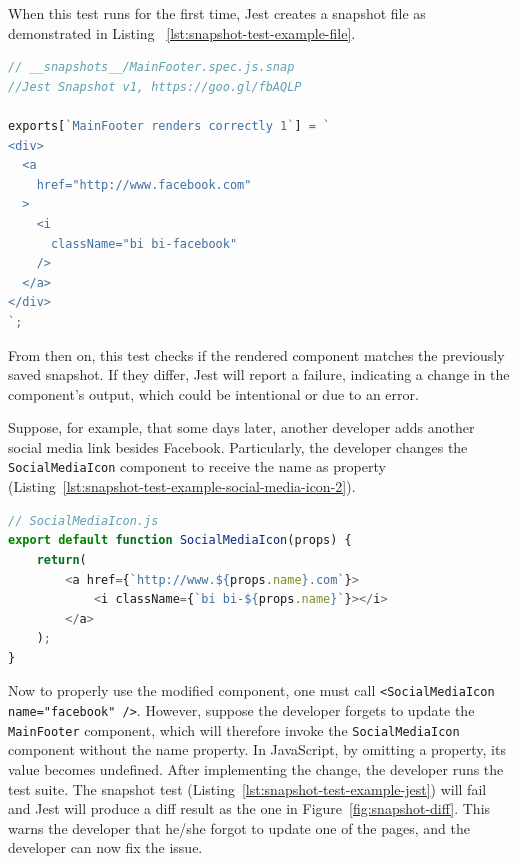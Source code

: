 \documentclass[
	msc, %
	english %
]{../ppgccufmg}
\begin{document}
When this test runs for the first time, Jest creates a snapshot file as demonstrated in Listing ~\ref{lst:snapshot-test-example-file}.

    \begin{lstlisting}[language=javascript, caption= Snapshot file example for a \texttt{MainFooter} component, label=lst:snapshot-test-example-file]
// __snapshots__/MainFooter.spec.js.snap
//Jest Snapshot v1, https://goo.gl/fbAQLP

exports[`MainFooter renders correctly 1`] = `
<div>
  <a
    href="http://www.facebook.com"
  >
    <i
      className="bi bi-facebook"
    />
  </a>
</div>
`;
    \end{lstlisting} 


From then on, this test checks if the rendered component matches the previously saved snapshot. If they differ, Jest will report a failure, indicating a change in the component's output, which could be intentional or due to an error.

Suppose, for example, that some days later, another developer adds another social media link besides Facebook. Particularly, the developer changes the \texttt{SocialMediaIcon} component to receive the name as property (Listing~\ref{lst:snapshot-test-example-social-media-icon-2}).

    \begin{lstlisting}[language=javascript, caption= Refactored \texttt{SocialMediaIcon} component, label=lst:snapshot-test-example-social-media-icon-2]
// SocialMediaIcon.js
export default function SocialMediaIcon(props) {
    return(
        <a href={`http://www.${props.name}.com`}>
            <i className={`bi bi-${props.name}`}></i>
        </a>
    );
}
    \end{lstlisting}


Now to properly use the modified component, one must call \texttt{<SocialMediaIcon name="facebook" />}. However, suppose the developer forgets to update the \texttt{MainFooter} component, which will therefore invoke the \texttt{SocialMediaIcon} component without the name property. In JavaScript, by omitting a property, its value becomes undefined. After implementing the change, the developer runs the test suite. The snapshot test (Listing~\ref{lst:snapshot-test-example-jest}) will fail and Jest will produce a diff result as the one in Figure~\ref{fig:snapshot-diff}. This warns the developer that he/she forgot to update one of the pages, and the developer can now fix the issue. 
\end{document}
